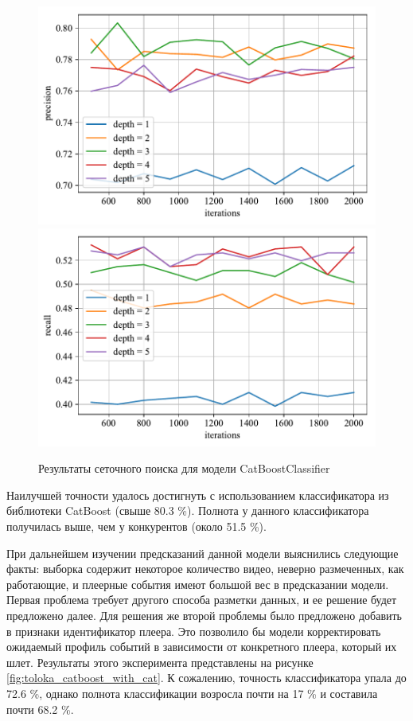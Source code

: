 \begin{figure}
    \centering
    \includegraphics{./images/toloka_catboost_precision.pdf}
    \includegraphics{./images/toloka_catboost_recall.pdf}
    \caption{Результаты сеточного поиска для модели CatBoostClassifier}
    \label{fig:toloka_catboost}
\end{figure}

Наилучшей точности удалось достигнуть с использованием классификатора из библиотеки CatBoost (свыше 80.3 \%). Полнота у данного классификатора получилась выше, чем у конкурентов (около 51.5 \%).

При дальнейшем изучении предсказаний данной модели выяснились следующие факты: выборка содержит некоторое количество видео, неверно размеченных, как работающие, и плеерные события имеют большой вес в предсказании модели. Первая проблема требует другого способа разметки данных, и ее решение будет предложено далее. Для решения же второй проблемы было предложено добавить в признаки идентификатор плеера. Это позволило бы модели корректировать ожидаемый профиль событий в зависимости от конкретного плеера, который их шлет. Результаты этого эксперимента представлены на рисунке \ref{fig:toloka_catboost_with_cat}. К сожалению, точность классификатора упала до 72.6 \%, однако полнота классификации возросла почти на 17 \% и составила почти 68.2 \%.

